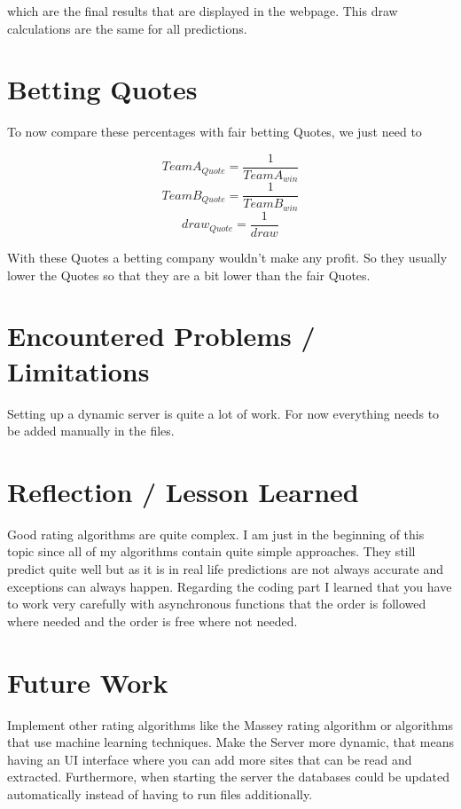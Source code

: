 \documentclass{article}
\begin{document}
which are the final results that are displayed in the webpage. This draw calculations are the same for all predictions.

\section{Betting Quotes}
To now compare these percentages with fair betting Quotes, we just need to 

$$TeamA_{Quote} = \frac{1} {TeamA_{win}}$$
$$TeamB_{Quote} = \frac{1}{TeamB_{win}}$$
$$draw_{Quote} = \frac{1} {draw}$$

With these Quotes a betting company wouldn't make any profit. So they usually lower the Quotes so that they are a bit lower than the fair Quotes.





\section{Encountered Problems / Limitations}
Setting up a dynamic server is quite a lot of work. For now everything needs to be added manually in the files. 


\section{Reflection / Lesson Learned}
Good rating algorithms are quite complex. I am just in the beginning of this topic since all of my algorithms contain quite simple approaches. They still predict quite well but as it is in real life predictions are not always accurate and exceptions can always happen. Regarding the coding part I learned that you have to work very carefully with asynchronous functions that the order is followed where needed and the order is free where not needed.



\section{Future Work}
Implement other rating algorithms like the Massey rating algorithm or algorithms that use machine learning techniques. Make the Server more dynamic, that means having an UI interface where you can add more sites that can be read and extracted. Furthermore, when starting the server the databases could be updated automatically instead of having to run files additionally.
\end{document}

